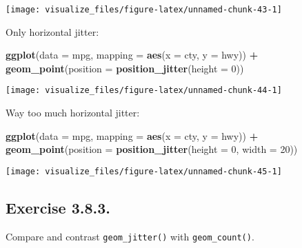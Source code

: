 \documentclass[]{book}
\newenvironment{Shaded}{\begin{snugshade}}{\end{snugshade}}
\newcommand{\DataTypeTok}[1]{\textcolor[rgb]{0.13,0.29,0.53}{#1}}
\newcommand{\DecValTok}[1]{\textcolor[rgb]{0.00,0.00,0.81}{#1}}
\newcommand{\KeywordTok}[1]{\textcolor[rgb]{0.13,0.29,0.53}{\textbf{#1}}}
\newcommand{\NormalTok}[1]{#1}
\newcommand{\OperatorTok}[1]{\textcolor[rgb]{0.81,0.36,0.00}{\textbf{#1}}}
\newcommand{\StringTok}[1]{\textcolor[rgb]{0.31,0.60,0.02}{#1}}
\theoremstyle{plain}
\theoremstyle{remark}
\theoremstyle{definition}
\theoremstyle{definition}
\theoremstyle{definition}
\theoremstyle{remark}
\begin{document}
\begin{center}\texttt{[image: visualize\_files/figure-latex/unnamed-chunk-43-1]} \end{center}

Only horizontal jitter:

\begin{Shaded}
\begin{Highlighting}[]
\KeywordTok{ggplot}\NormalTok{(}\DataTypeTok{data =}\NormalTok{ mpg, }\DataTypeTok{mapping =} \KeywordTok{aes}\NormalTok{(}\DataTypeTok{x =}\NormalTok{ cty, }\DataTypeTok{y =}\NormalTok{ hwy)) }\OperatorTok{+}
\StringTok{  }\KeywordTok{geom_point}\NormalTok{(}\DataTypeTok{position =} \KeywordTok{position_jitter}\NormalTok{(}\DataTypeTok{height =} \DecValTok{0}\NormalTok{))}
\end{Highlighting}
\end{Shaded}

\begin{center}\texttt{[image: visualize\_files/figure-latex/unnamed-chunk-44-1]} \end{center}

Way too much horizontal jitter:

\begin{Shaded}
\begin{Highlighting}[]
\KeywordTok{ggplot}\NormalTok{(}\DataTypeTok{data =}\NormalTok{ mpg, }\DataTypeTok{mapping =} \KeywordTok{aes}\NormalTok{(}\DataTypeTok{x =}\NormalTok{ cty, }\DataTypeTok{y =}\NormalTok{ hwy)) }\OperatorTok{+}
\StringTok{  }\KeywordTok{geom_point}\NormalTok{(}\DataTypeTok{position =} \KeywordTok{position_jitter}\NormalTok{(}\DataTypeTok{height =} \DecValTok{0}\NormalTok{, }\DataTypeTok{width =} \DecValTok{20}\NormalTok{))}
\end{Highlighting}
\end{Shaded}

\begin{center}\texttt{[image: visualize\_files/figure-latex/unnamed-chunk-45-1]} \end{center}

\hypertarget{exercise-3.8.3.}{%
\subsection*{\texorpdfstring{Exercise
{3.8.3}.}{Exercise 3.8.3.}}\label{exercise-3.8.3.}}

Compare and contrast \texttt{geom\_jitter()} with
\texttt{geom\_count()}.
\end{document}
